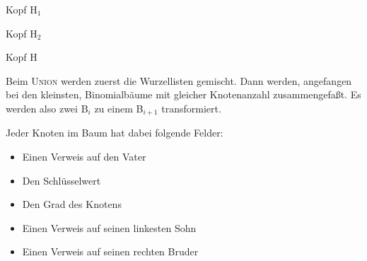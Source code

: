 \documentclass[ngerman,draft,parskip=half*,twoside]{scrreprt}
\theoremstyle{break}
\theoremstyle{nonumberbreak}
\begin{document}
\begin{bundle}{Kopf H$_1$}
  
\end{bundle} \hspace{15mm}
\begin{bundle}{Kopf H$_2$}
  
\end{bundle}\hspace{15mm}
\begin{bundle}{Kopf H}
\end{bundle}

Beim \textsc{Union} werden zuerst die Wurzellisten gemischt. Dann werden, angefangen bei den kleinsten,
Binomialbäume mit gleicher Knotenanzahl zusammengefaßt. Es werden also zwei B$_i$ zu einem B$_{i+1}$
transformiert.

Jeder Knoten im Baum hat dabei folgende Felder:
\begin{itemize}
\item Einen Verweis auf den Vater
\item Den Schlüsselwert
\item Den Grad des Knotens
\item Einen Verweis auf seinen linkesten Sohn
\item Einen Verweis auf seinen rechten Bruder
\end{itemize}
\end{document}
